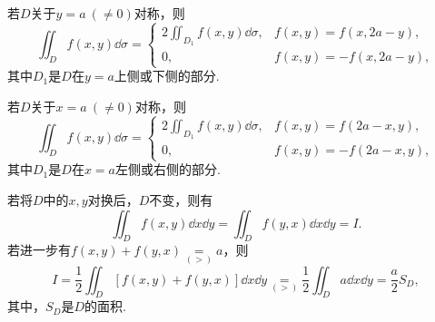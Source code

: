 若\(D\)关于\(y=a\ (\neq0)\)对称，则\[
	\iint_D f(x,y) \dd\sigma
	= \left\{ \begin{array}{cc}
		2 \iint_{D_1} f(x,y) \dd\sigma, & f(x,y) = f(x,2a-y), \\
		0, & f(x,y) = -f(x,2a-y),
	\end{array} \right.
\]
其中\(D_1\)是\(D\)在\(y=a\)上侧或下侧的部分.

若\(D\)关于\(x=a\ (\neq0)\)对称，则\[
	\iint_D f(x,y) \dd\sigma
	= \left\{ \begin{array}{cc}
		2 \iint_{D_1} f(x,y) \dd\sigma, & f(x,y) = f(2a-x,y), \\
		0, & f(x,y) = -f(2a-x,y),
	\end{array} \right.
\]
其中\(D_1\)是\(D\)在\(x=a\)左侧或右侧的部分.

\def\op{\underset{(>)}{=}}
若将\(D\)中的\(x,y\)对换后，\(D\)不变，则有\[
	\iint_D f(x,y) \dd{x}\dd{y} = \iint_D f(y,x) \dd{x}\dd{y} = I.
\]
若进一步有\(f(x,y)+f(y,x) \op a\)，则\[
	I = \frac{1}{2} \iint_D [ f(x,y) + f(y,x) ] \dd{x}\dd{y}
	\op \frac{1}{2} \iint_D a \dd{x}\dd{y}
	= \frac{a}{2} S_D,
\]
其中，\(S_D\)是\(D\)的面积.
\endgroup

